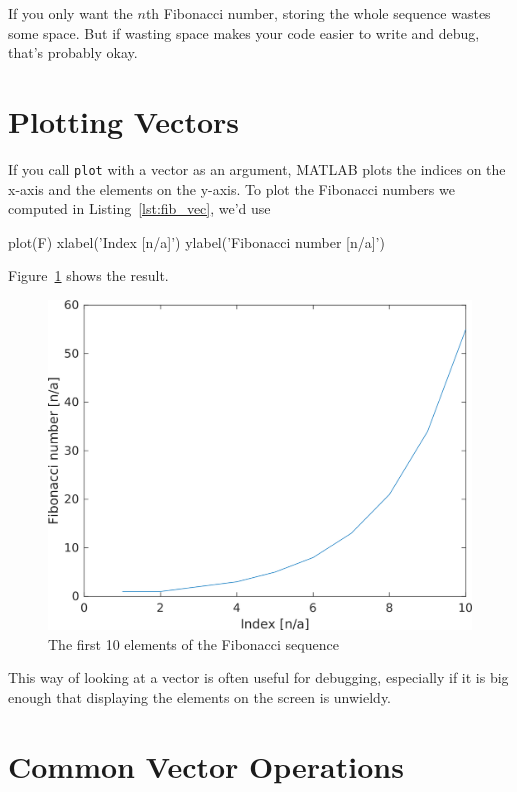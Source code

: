 If you only want the $n$th Fibonacci number, storing
the whole sequence wastes some space.  But if wasting space
makes your code easier to write and debug, that's probably okay.


\section{Plotting Vectors}


If you call \lstinline{plot} with a vector as an argument,
MATLAB plots the indices on the x-axis and the elements on the
y-axis.  To plot the Fibonacci numbers we computed in Listing~\ref{lst:fib_vec}, we'd use

\begin{code}
plot(F)
xlabel('Index [n/a]')
ylabel('Fibonacci number [n/a]')
\end{code}

Figure~\ref{fig:fibonacci} shows the result.

\begin{figure}[h]
\centerline{\includegraphics[scale=0.7]{images/figure04_fib}}
\caption{The first 10 elements of the Fibonacci sequence}
\label{fig:fibonacci}
\end{figure}

This way of looking at a vector is often useful for debugging, especially
if it is big enough that displaying the elements on
the screen is unwieldy.


\section{Common Vector Operations}

